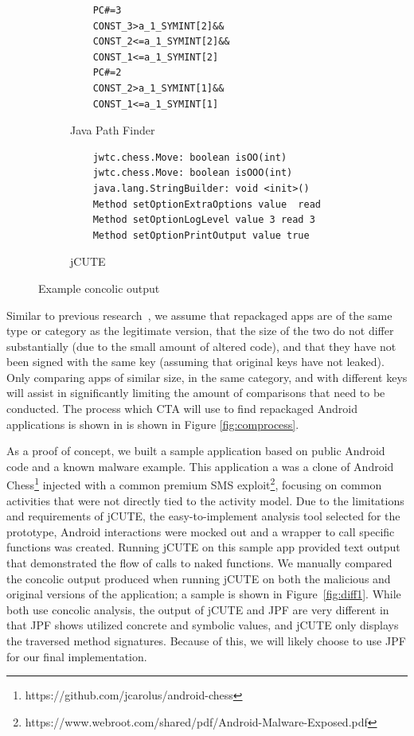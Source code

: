 \documentclass{sig-alternate}
\newcommand{\dan}[1]{\textcolor{blue}{{\it [Dan says: #1]}}}
\begin{document}
\begin{figure} [h]
\vspace{2 mm}

\begin{subfigure}[b]{0.48\textwidth}
	\label{fig:JavaPathFinder}
	\begin{lstlisting}
	PC#=3
	CONST_3>a_1_SYMINT[2]&&
	CONST_2<=a_1_SYMINT[2]&&
	CONST_1<=a_1_SYMINT[2]
	PC#=2
	CONST_2>a_1_SYMINT[1]&&
	CONST_1<=a_1_SYMINT[1]
	\end{lstlisting}\caption{Java Path Finder}
\end{subfigure}
\begin{subfigure}[b]{0.48\textwidth}
	\label{fig:jCUTE}
	\begin{lstlisting}
	jwtc.chess.Move: boolean isOO(int)
	jwtc.chess.Move: boolean isOOO(int)
	java.lang.StringBuilder: void <init>()
	Method setOptionExtraOptions value  read
	Method setOptionLogLevel value 3 read 3
	Method setOptionPrintOutput value true
	\end{lstlisting}\caption{jCUTE}
\end{subfigure}
\caption{Example concolic output~\label{fig:exampleoutput}}
\end{figure}

Similar to previous research~\cite{Zhou:2012:DRS:2133601.2133640}, we assume that repackaged apps are of the same type or category as the legitimate version, that the size of the two do not differ substantially (due to the small amount of altered code), and that they have not been signed with the same key (assuming that original keys have not leaked). Only comparing apps of similar size, in the same category, and with different keys will assist in significantly limiting the amount of comparisons that need to be conducted. The process which CTA will use to find repackaged Android applications is shown in is shown in Figure \ref{fig:comprocess}.


As a proof of concept, we built a sample application based on public Android code and a known malware example. This application a was a clone of Android Chess\footnote{https://github.com/jcarolus/android-chess} injected with a common premium SMS exploit\footnote{https://www.webroot.com/shared/pdf/Android-Malware-Exposed.pdf}, focusing on common activities that were not directly tied to the activity model.  Due to the limitations and requirements of jCUTE, the easy-to-implement analysis tool selected for the prototype, Android interactions were mocked out and a wrapper to call specific functions was created.  Running jCUTE on this sample app provided text output that demonstrated the flow of calls to naked functions. We manually compared the concolic output produced when running jCUTE on both the malicious and original versions of the application; a sample is shown in Figure~\ref{fig:diff1}. While both use concolic analysis, the output of jCUTE and JPF are very different in that JPF shows utilized concrete and symbolic values, and jCUTE only displays the traversed method signatures. Because of this, we will likely choose to use JPF for our final implementation.
\end{document}
